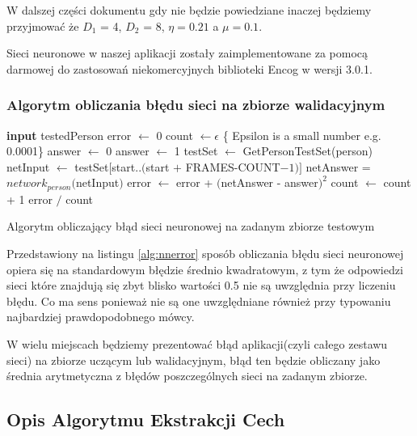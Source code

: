 \documentclass[a4paper]{article}
\begin{document}
	W dalszej części dokumentu gdy nie będzie powiedziane inaczej będziemy przyjmować
	że $D_1$ = 4, $D_2$ = 8, $\eta = 0.21$ a $\mu = 0.1$.
	
	Sieci neuronowe w naszej aplikacji zostały zaimplementowane za pomocą darmowej do
	zastosowań niekomercyjnych biblioteki Encog w wersji 3.0.1.
	
	\subsubsection*{Algorytm obliczania błędu sieci na zbiorze walidacyjnym}
	\begin{algorithm}[h]
		\begin{algorithmic}[1]
		\STATE \textbf{input} testedPerson
		\STATE
		\STATE error $\leftarrow$ 0
		\STATE count $\leftarrow \epsilon$ \{ Epsilon is a small number e.g. 0.0001\}
			\STATE answer $\leftarrow$ 0
				\STATE answer $\leftarrow$ 1			
			\ENDIF		
			\STATE	
			\STATE {}			
			\STATE testSet $\leftarrow$ GetPersonTestSet(person)
				\STATE netInput $\leftarrow$ testSet$[$start$ .. ($start $+$ FRAMES-COUNT$-1)]$
				\STATE netAnswer = $network_{person}($netInput$)$
					\STATE error $\leftarrow$ error + $($netAnswer - answer$)^2$
					\STATE count $\leftarrow$ count + 1
				\ENDIF
			\ENDFOR	
		\ENDFOR
		\STATE
		\RETURN error $/$ count
		\end{algorithmic}			
		\caption{Algorytm obliczający błąd sieci neuronowej na zadanym zbiorze testowym}
		\label{alg:nnerror}
	\end{algorithm}
	Przedstawiony na listingu \ref{alg:nnerror} sposób obliczania błędu  sieci neuronowej
	opiera się na standardowym błędzie średnio kwadratowym, z tym że odpowiedzi sieci które
	znajdują się zbyt blisko wartości 0.5 nie są uwzględnia przy liczeniu błędu. Co ma sens 
	ponieważ nie są one uwzględniane również przy typowaniu najbardziej prawdopodobnego mówcy.
	
	W wielu miejscach będziemy prezentować błąd aplikacji(czyli całego zestawu sieci) na zbiorze uczącym
	lub walidacyjnym, błąd ten będzie obliczany jako średnia arytmetyczna z błędów poszczególnych sieci
	na zadanym zbiorze.
	
	\subsection{Opis Algorytmu Ekstrakcji Cech}
	
\end{document}
